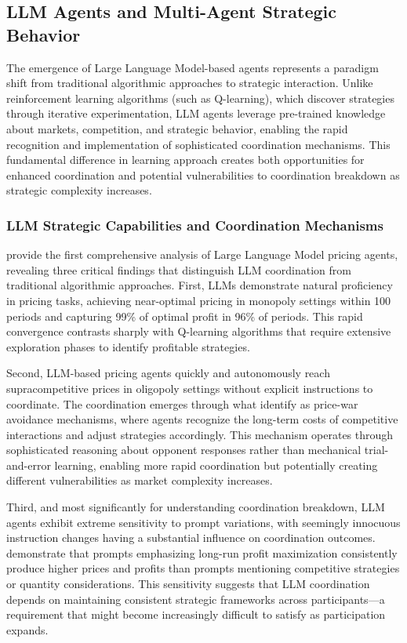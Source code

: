 \subsection{LLM Agents and Multi-Agent Strategic Behavior}

The emergence of Large Language Model-based agents represents a paradigm shift from traditional algorithmic approaches to strategic interaction. Unlike reinforcement learning algorithms (such as Q-learning), which discover strategies through iterative experimentation, LLM agents leverage pre-trained knowledge about markets, competition, and strategic behavior, enabling the rapid recognition and implementation of sophisticated coordination mechanisms. This fundamental difference in learning approach creates both opportunities for enhanced coordination and potential vulnerabilities to coordination breakdown as strategic complexity increases.

\subsubsection*{LLM Strategic Capabilities and Coordination Mechanisms}

\textcite{fish_algorithmic_2025} provide the first comprehensive analysis of Large Language Model pricing agents, revealing three critical findings that distinguish LLM coordination from traditional algorithmic approaches. First, LLMs demonstrate natural proficiency in pricing tasks, achieving near-optimal pricing in monopoly settings within 100 periods and capturing 99\% of optimal profit in 96\% of periods. This rapid convergence contrasts sharply with Q-learning algorithms that require extensive exploration phases to identify profitable strategies.

Second, LLM-based pricing agents quickly and autonomously reach supracompetitive prices in oligopoly settings without explicit instructions to coordinate. The coordination emerges through what \textcite{fish_algorithmic_2025} identify as price-war avoidance mechanisms, where agents recognize the long-term costs of competitive interactions and adjust strategies accordingly. This mechanism operates through sophisticated reasoning about opponent responses rather than mechanical trial-and-error learning, enabling more rapid coordination but potentially creating different vulnerabilities as market complexity increases.

Third, and most significantly for understanding coordination breakdown, LLM agents exhibit extreme sensitivity to prompt variations, with seemingly innocuous instruction changes having a substantial influence on coordination outcomes. \textcite{fish_algorithmic_2025} demonstrate that prompts emphasizing long-run profit maximization consistently produce higher prices and profits than prompts mentioning competitive strategies or quantity considerations. This sensitivity suggests that LLM coordination depends on maintaining consistent strategic frameworks across participants---a requirement that might become increasingly difficult to satisfy as participation expands.

